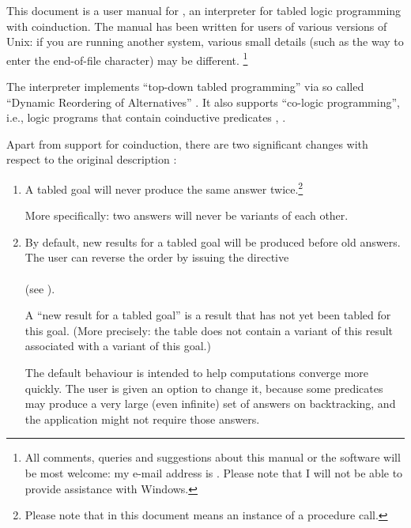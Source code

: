 

This document is a user manual for , an interpreter for tabled
logic programming with coinduction.  The manual has been written for users of
various versions of Unix: if you are running another system, various small
details (such as the way to enter the end-of-file character) may be
different.%
\footnote{
  All comments, queries and suggestions about this manual or the software
  will be most welcome: my e-mail address is
  .  Please note that I will not be able
  to provide assistance with Windows.}

The interpreter implements ``top-down tabled programming'' via so called
``Dynamic Reordering of Alternatives'' \cite{guo-gupta-dra}.  It also
supports ``co-logic programming'', i.e., logic programs that contain
coinductive predicates \cite{coinductive}, \cite{co-LP}.


Apart from support for coinduction, there are two significant changes with
respect to the original description \cite{guo-gupta-dra}:
\begin{enumerate}

\item
  A tabled goal will never produce the same answer twice.\footnote{
  Please note that in this document  means an instance of a
  procedure call.}

  More specifically: two answers will never be variants of each
  other.

\item
  By default, new results for a tabled goal will be produced before old
  answers.  The user can reverse the order by issuing the directive\\
  \ind{}\\
  (see ).

  A ``new result for a tabled goal''\label{new-result} is a result that has
  not yet been tabled for this goal.  (More precisely: the table does not
  contain a variant of this result associated with a variant of this goal.)

  The default behaviour is intended to help computations converge more
  quickly.  The user is given an option to change it, because some predicates
  may produce a very large (even infinite) set of answers on backtracking,
  and the application might not require those answers.
\end{enumerate}


